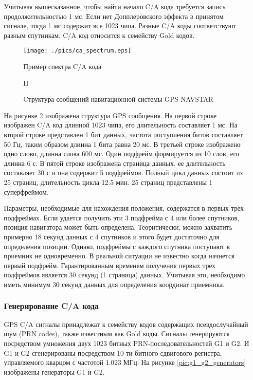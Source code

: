 Учитывая вышесказанное, чтобы найти начало C/A кода требуется запись продолжительностью 1 мс. Если нет Допплеровского
эффекта в принятом сигнале, тогда 1 мс содержит все 1023 чипа. Разные C/A коды соответствуют разным спутникам.
C/A код относится к семейству Gold кодов.

\begin{figure}
\begin{center}
\texttt{[image: ./pics/ca\_spectrum.eps]}
\end{center}
\caption{Пример спектра C/A кода}
\label{pic:ca_spectrum}
\end{figure}

\begin{figure}{H}
\begin{center}
\end{center}
\caption{Cтруктура сообщений навигационной системы GPS NAVSTAR}
\label{pic:gps_data_format}
\end{figure}

На рисунке \ref{pic:gps_data_format} изображена структура GPS сообщения. На первой строке изображен C/A код
длинной 1023 чипа, его длительность составляет 1 мс. На второй строке представлен 1 бит данных, частота поступления
битов составляет 50 Гц, таким образом длинна 1 бита равна 20 мс. В третьей строке изображено одно слово, длинна слова
600 мс. Один подфрейм формируется из 10 слов, его длинна 6 с. В пятой строке изображена страница данных, ее длительность
составляет 30 с и она содержит 5 подфреймов. Полный цикл данных состоит из 25 страниц, длительность цикла 12.5 мин.
25 страниц представлены 1 суперфреймом.

Параметры, необходимые для нахождения положения, содержатся в первых трех подфреймах. Если удается получить эти 3
подфрейма с 4 или более спутников, позиция навигатора может быть определена.  Теоритически, можно захватить примерно
18 секунд данных с 4 спутников и этого будет достаточно для определения позиции. Однако, подфреймы с каждого спутника
поступают в приемник не одновременно. В реальной ситуации не известно когда начнется первый подфрейм. Гарантированным
временем получения первых трех подфреймов является 30 секунд (1 страница) данных. Учитывая это, необходимо иметь
минимум 30 секунд данных для определения координат приемника.

\subsubsection*{Генерирование C/A кода}
GPS C/A сигналы принадлежат к семейству кодов содержащих псевдослучайный шум (PRN codes), также известным как Gold коды.
Сигналы генерируются посредством умножения двух 1023 битных PRN-последовательностей G1 и G2. И G1 и G2 сгенерированы
посредством 10-ти битного сдвигового регистра, управляемого кварцом с частотой 1.023 МГц. На рисунке
\ref{pic:g1_g2_generators} изображены генераторы G1 и G2.

